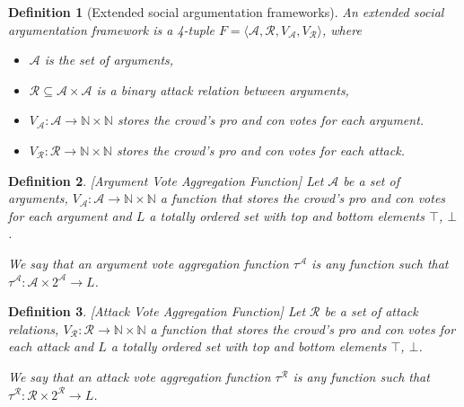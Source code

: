 \documentclass{article}
\date{ }
\newtheorem{definition}{Definition}
\newcommand{\nat}{\mathbb{N}}   %
\newcommand{\args}{\mathcal{A}} %
\newcommand{\att}{\mathcal{R}}  %
\newcommand{\valueset}{L}
\newcommand{\varg}{V_{\args}}   %
\newcommand{\vatt}{V_{\att}}   %
\newcommand{\safid}{F}               %
\newcommand{\saf}{\safid = \safbody} %
\newcommand{\safbody}{\langle \args, \att, \varg, \vatt \rangle} %
\begin{document}



\begin{definition}[Extended social argumentation frameworks]
An \emph{extended social argumentation framework} is a 4-tuple $\saf$, where
\begin{itemize}
  \item $\args$ is the set of arguments,
  \item $\att \subseteq \args \times \args$ is a binary attack relation between arguments,
  \item $\varg : \args \to \nat \times \nat$ stores the crowd's pro and con votes for each argument.
  \item $\vatt : \att \to \nat \times \nat$ stores the crowd's pro and con votes for each attack.
\end{itemize}
\end{definition}

\begin{definition}
\label{def:voteAgg}
[Argument Vote Aggregation Function]
Let $\args$ be a set of arguments, $\varg : \args \to \nat \times \nat$ a function that stores the crowd's pro and con votes for each argument and  $\valueset$ a totally ordered set with top and bottom elements $\top$, $\bot$.

We say that an argument vote aggregation function $\tau^{\args}$ is any function such that $\tau^{\args}: \args \times {2}^{\args} \to L$.
\end{definition}

\begin{definition}
\label{def:voteAgg}
[Attack Vote Aggregation Function]
Let $\att$ be a set of attack relations, $\vatt : \att \to \nat \times \nat$ a function that stores the crowd's pro and con votes for each attack and  $\valueset$ a totally ordered set with top and bottom elements $\top$, $\bot$.

We say that an attack vote aggregation function $\tau^{\att}$ is any function such that $\tau^{\att}: \att \times {2}^{\att} \to L$.
\end{definition}
\end{document}
